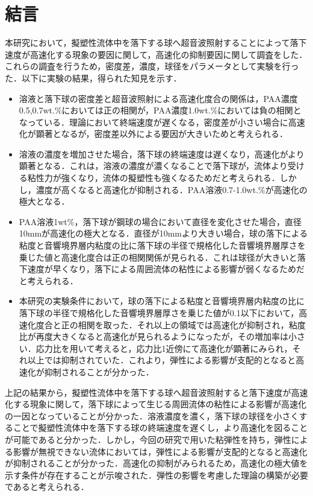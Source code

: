 \section{結言}
本研究において，擬塑性流体中を落下する球へ超音波照射することによって落下速度が高速化する現象の要因に関して，高速化の抑制要因に関して調査をした．これらの調査を行うため，密度差，濃度，球径をパラメータとして実験を行った．以下に実験の結果，得られた知見を示す．

\begin{itemize}
    \item 溶液と落下球の密度差と超音波照射による高速化度合の関係は，PAA濃度0.5,0.7wt.\%においては正の相関が，PAA濃度1.0wt.\%においては負の相関となっている．理論において終端速度が遅くなる，密度差が小さい場合に高速化が顕著となるが，密度差以外による要因が大きいためと考えられる．
    \item 溶液の濃度を増加させた場合，落下球の終端速度は遅くなり，高速化がより顕著となる．これは，溶液の濃度が濃くなることで落下球が，流体より受ける粘性力が強くなり，流体の擬塑性も強くなるためだと考えられる．しかし，濃度が高くなると高速化が抑制される．PAA溶液0.7-1.0wt.\%が高速化の極大となる．
    \item PAA溶液1wt\%，落下球が鋼球の場合において直径を変化させた場合，直径10mmが高速化の極大となる．直径が10mmより大きい場合，球の落下による粘度と音響境界層内粘度の比に落下球の半径で規格化した音響境界層厚さを乗じた値と高速化度合は正の相関関係が見られる．これは球径が大きいと落下速度が早くなり，落下による周囲流体の粘性による影響が弱くなるためだと考えられる．
    \item 本研究の実験条件において，球の落下による粘度と音響境界層内粘度の比に落下球の半径で規格化した音響境界層厚さを乗じた値が0.1以下において，高速化度合と正の相関を取った．それ以上の領域では高速化が抑制され，粘度比が再度大きくなると高速化が見られるようになったが，その増加率は小さい．応力比を用いて考えると，応力比1近傍にて高速化が顕著にみられ，それ以上では抑制されていた．これより，弾性による影響が支配的となると高速化が抑制されることが分かった．
\end{itemize}

上記の結果から，擬塑性流体中を落下する球へ超音波照射すると落下速度が高速化する現象に関して，落下球によって生じる周囲流体の粘性による影響が高速化の一因となっていることが分かった．溶液濃度を濃く，落下球の球径を小さくすることで擬塑性流体中を落下する球の終端速度を遅くし，より高速化を図ることが可能であると分かった．しかし，今回の研究で用いた粘弾性を持ち，弾性による影響が無視できない流体においては，弾性による影響が支配的となると高速化が抑制されることが分かった．高速化の抑制がみられるため，高速化の極大値を示す条件が存在することが示唆された．弾性の影響を考慮した理論の構築が必要であると考えられる．